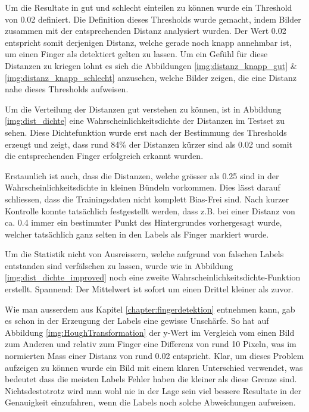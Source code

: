 Um die Resultate in gut und schlecht einteilen zu können wurde ein Threshold von 0.02 definiert.
Die Definition dieses Thresholds wurde gemacht, indem Bilder zusammen mit der entsprechenden Distanz analysiert wurden.
Der Wert 0.02 entspricht somit derjenigen Distanz, welche gerade noch knapp annehmbar ist, um einen Finger als detektiert gelten zu lassen.
Um ein Gefühl für diese Distanzen zu kriegen lohnt es sich die Abbildungen \ref{img:distanz_knapp_gut} \& \ref{img:distanz_knapp_schlecht} anzusehen, welche Bilder zeigen, die eine Distanz nahe dieses Thresholds aufweisen. 

Um die Verteilung der Distanzen gut verstehen zu können, ist in Abbildung \ref{img:dist_dichte} eine Wahrscheinlichkeitsdichte der Distanzen im Testset zu sehen. Diese Dichtefunktion wurde erst nach der Bestimmung des Thresholds erzeugt und zeigt, dass rund 84\% der Distanzen kürzer sind als 0.02 und somit die entsprechenden Finger \grqq{}erfolgreich\grqq{} erkannt wurden.

Erstaunlich ist auch, dass die Distanzen, welche grösser als 0.25 sind in der Wahrscheinlichkeitsdichte in kleinen Bündeln vorkommen. 
Dies lässt darauf schliessen, dass die Trainingsdaten nicht komplett Bias-Frei sind.
Nach kurzer Kontrolle konnte tatsächlich festgestellt werden, dass z.B. bei einer Distanz von ca. 0.4 immer ein bestimmter Punkt des Hintergrundes vorhergesagt wurde, welcher tatsächlich ganz selten in den Labels als Finger markiert wurde. 

Um die Statistik nicht von Ausreissern, welche aufgrund von falschen Labels entstanden sind verfälschen zu lassen, wurde wie in Abbildung \ref{img:dist_dichte_improved} noch eine zweite Wahrscheinlichkeitsdichte-Funktion erstellt. Spannend: Der Mittelwert ist sofort um einen Drittel kleiner als zuvor. 

Wie man ausserdem aus Kapitel \ref{chapter:fingerdetektion} entnehmen kann, gab es schon in der Erzeugung der Labels eine gewisse Unschärfe.
So hat auf Abbildung \ref{img:HoughTransformation}  der y-Wert im Vergleich vom einen Bild zum Anderen und relativ zum Finger eine Differenz von rund 10 Pixeln, was im normierten Mass einer Distanz von rund 0.02 entspricht.
Klar, um dieses Problem aufzeigen zu können wurde ein Bild mit einem klaren Unterschied verwendet, was bedeutet dass die meisten Labels Fehler haben die kleiner als diese Grenze sind.
Nichtsdestotrotz wird man wohl nie in der Lage sein viel bessere Resultate in der Genauigkeit einzufahren, wenn die Labels noch solche Abweichungen aufweisen.


